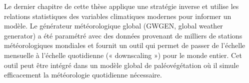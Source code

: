 \begin{thesisabstract}[]
Le dernier chapitre de cette thèse applique une stratégie inverse et utilise les relations statistiques des variables climatiques modernes pour informer un modèle. Le générateur météorologique global (GWGEN, global weather generator) a été paramétré avec des données provenant de milliers de stations météorologiques mondiales et fournit un outil qui permet de passer de l’échelle mensuelle à l’échelle quotidienne (« downscaling ») pour le monde entier. Cet outil peut être intégré dans un modèle global de paléovégétation où il simule efficacement la météorologie quotidienne nécessaire.
\end{thesisabstract}

\renewcommand{\abstractname}{\Oldabstractname}
\renewcommand{\univname}{\Oldunivname}
\renewcommand{\facname}{\Oldfacname}
\renewcommand{\deptname}{\Olddeptname}
\renewcommand{\degreename}{\Olddegreename}



